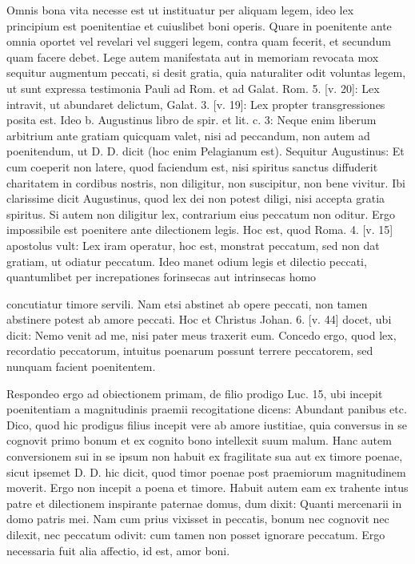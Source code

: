 Omnis bona vita necesse est ut instituatur per aliquam legem, ideo lex principium est poenitentiae et cuiuslibet boni operis. Quare in poenitente ante omnia oportet vel revelari vel suggeri legem, contra quam fecerit, et secundum quam facere debet. Lege autem manifestata aut in memoriam revocata mox sequitur augmentum peccati, si desit gratia, quia naturaliter odit voluntas legem, ut sunt expressa testimonia Pauli ad Rom. et ad Galat. Rom. 5. [v. 20]: Lex intravit, ut abundaret delictum, Galat. 3. [v. 19]: Lex \marginpar{\small[362]} propter transgressiones posita est. Ideo b. Augustinus libro de spir. et lit. c. 3: Neque enim liberum arbitrium ante gratiam quicquam valet, nisi ad peccandum, non autem ad poenitendum, ut D. D. dicit (hoc enim Pelagianum est). Sequitur Augustinus: Et cum coeperit non latere, quod faciendum est, nisi spiritus sanctus diffuderit charitatem in cordibus nostris, non diligitur, non suscipitur, non bene vivitur. Ibi clarissime dicit Augustinus, quod lex dei non potest diligi, nisi accepta gratia spiritus. Si autem non diligitur lex, contrarium eius peccatum non oditur. Ergo impossibile est poenitere ante dilectionem legis. Hoc est, quod Roma. 4. [v. 15] apostolus vult: Lex iram operatur, hoc est, monstrat peccatum, sed non dat gratiam, ut odiatur peccatum. Ideo manet odium legis et dilectio peccati, quantumlibet per increpationes forinsecas aut intrinsecas homo

concutiatur timore servili. Nam etsi abstinet ab opere peccati, non tamen abstinere potest ab amore peccati. Hoc et Christus Johan. 6. [v. 44] docet, ubi dicit: Nemo venit ad me, nisi pater meus traxerit eum. Concedo ergo, quod lex, recordatio peccatorum, intuitus poenarum possunt terrere peccatorem, sed nunquam facient poenitentem.

Respondeo ergo ad obiectionem primam, de filio prodigo Luc. 15, ubi incepit poenitentiam a magnitudinis praemii recogitatione dicens: Abundant panibus etc. Dico, quod hic prodigus filius incepit vere ab amore iustitiae, quia conversus in se cognovit primo bonum et ex cognito bono intellexit suum malum. Hanc autem conversionem sui in se ipsum non habuit ex fragilitate sua aut ex timore poenae, sicut ipsemet D. D. hic dicit, quod timor poenae post praemiorum magnitudinem moverit. Ergo non incepit a poena et timore. Habuit autem eam ex trahente intus patre et dilectionem inspirante paternae domus, dum dixit: Quanti mercenarii in domo patris mei. Nam cum prius vixisset in peccatis, bonum nec cognovit nec dilexit, nec peccatum odivit: cum tamen non posset ignorare peccatum. Ergo necessaria fuit alia affectio, id est, amor boni.

